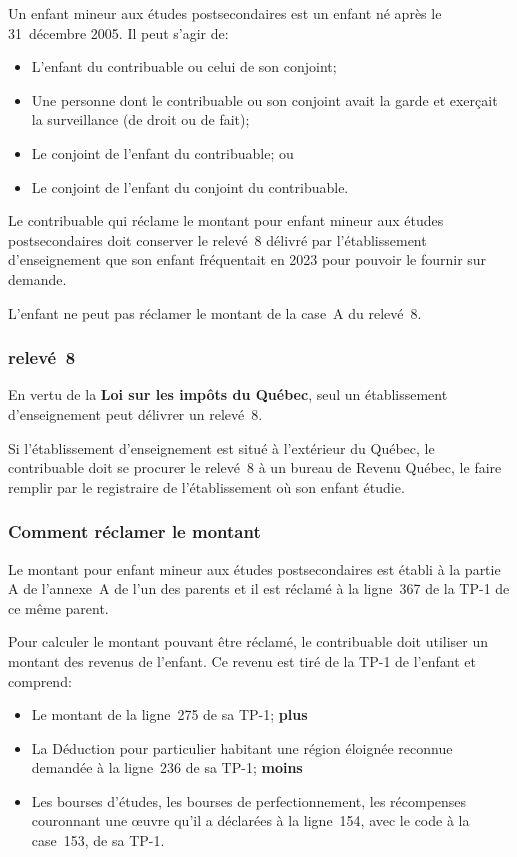 Un enfant mineur aux études postsecondaires est un enfant né après le 31~décembre 2005. Il peut s'agir de:
\begin{itemize}
	\item L'enfant du contribuable ou celui de son conjoint;
	\item Une personne dont le contribuable ou son conjoint avait la garde et exerçait la surveillance (de droit ou de fait);
	\item Le conjoint de l'enfant du contribuable; ou
	\item Le conjoint de l'enfant du conjoint du contribuable.
\end{itemize}

Le contribuable qui réclame le montant pour enfant mineur aux études postsecondaires doit conserver le relevé~8 délivré par l'établissement d'enseignement que son enfant fréquentait en 2023 pour pouvoir le fournir sur demande. 

\begin{note}
	L'enfant ne peut pas réclamer le montant de la case~A du relevé~8.
\end{note}

\subsubsection{relevé~8}
En vertu de la \textbf{Loi sur les impôts du Québec}, seul un établissement d'enseignement peut délivrer un relevé~8.

Si l'établissement d'enseignement est situé à l'extérieur du Québec, le contribuable doit se procurer le relevé~8 à un bureau de Revenu Québec, le faire remplir par le registraire de l'établissement où son enfant étudie.

\subsubsection{Comment réclamer le montant}
Le montant pour enfant mineur aux études postsecondaires est établi à la partie A de l'annexe~A de l'un des parents et il est réclamé à la ligne~367 de la TP-1 de ce même parent.

Pour calculer le montant pouvant être réclamé, le contribuable doit utiliser un montant des revenus de l'enfant. Ce revenu est tiré de la TP-1 de l'enfant et comprend:
\begin{itemize}
	\item Le montant de la ligne~275 de sa TP-1; \textbf{plus}
	\item La \og Déduction pour particulier habitant une région éloignée reconnue \fg{} demandée à la ligne~236 de sa TP-1; \textbf{moins}
	\item Les bourses d'études, les bourses de perfectionnement, les récompenses couronnant une œuvre qu'il a déclarées à la ligne~154, avec le code  \fg{} à la case~153, de sa TP-1.
\end{itemize}

